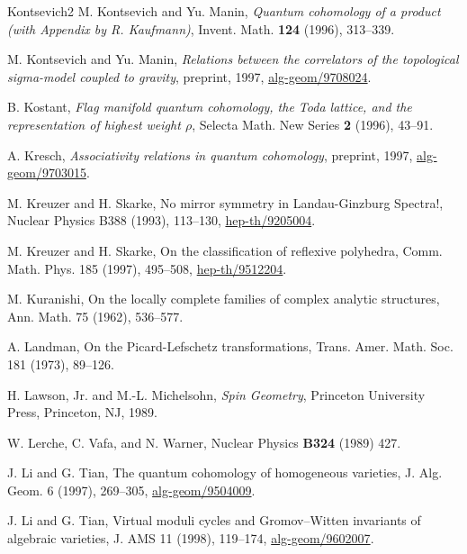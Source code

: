 \begin{thebibliography}{Kontsevich2}
\hypertarget{bib:KoM2}{} M. Kontsevich and Yu. Manin, \emph{Quantum cohomology of a product (with Appendix by R. Kaufmann)}, Invent. Math. \textbf{124} (1996), 313--339.

\hypertarget{bib:KoM3}{}
M. Kontsevich and Yu. Manin, \emph{Relations between the correlators of the topological sigma-model coupled to gravity}, preprint, 1997, \href{https://arxiv.org/abs/alg-geom/9708024}{alg-geom/9708024}.

\hypertarget{bib:Kostant}{} B. Kostant, \emph{Flag manifold quantum cohomology, the Toda lattice, and the representation of highest weight $\rho$}, Selecta Math. New Series \textbf{2} (1996), 43--91.

\hypertarget{bib:Kresch}{} A. Kresch, \emph{Associativity relations in quantum cohomology}, preprint, 1997, \href{https://arxiv.org/abs/alg-geom/9703015}{alg-geom/9703015}.

\hypertarget{bib:KS2}{}
M. Kreuzer and H. Skarke, No mirror symmetry in Landau-Ginzburg Spectra!,
Nuclear Physics B388 (1993), 113--130, \href{https://arxiv.org/abs/hep-th/9205004}{hep-th/9205004}.

\hypertarget{bib:KS3}{}
M. Kreuzer and H. Skarke, On the classification of reflexive polyhedra,
Comm. Math. Phys. 185 (1997), 495--508, \href{https://arxiv.org/abs/hep-th/9512204}{hep-th/9512204}.

\hypertarget{bib:Kuranishi}{}
M. Kuranishi, On the locally complete families of complex analytic structures, Ann. Math. 75 (1962), 536--577.

\hypertarget{bib:Landman}{}
A. Landman, On the Picard-Lefschetz transformations,
Trans. Amer. Math. Soc. 181 (1973), 89--126.

\hypertarget{bib:LM}{} H. Lawson, Jr. and M.-L. Michelsohn, \emph{Spin Geometry}, Princeton University Press, Princeton, NJ, 1989.

\hypertarget{bib:LVW}{} W. Lerche, C. Vafa, and N. Warner, Nuclear Physics \textbf{B324} (1989) 427.

\hypertarget{bib:LTi1}{}
J. Li and G. Tian, The quantum cohomology of homogeneous varieties, J. Alg. Geom. 6 (1997), 269--305, \href{https://arxiv.org/abs/alg-geom/9504009}{alg-geom/9504009}.

\hypertarget{bib:LTi2}{}
J. Li and G. Tian, Virtual moduli cycles and Gromov--Witten invariants of algebraic varieties, J. AMS 11 (1998), 119--174, \href{https://arxiv.org/abs/alg-geom/9602007}{alg-geom/9602007}.


\end{thebibliography}
